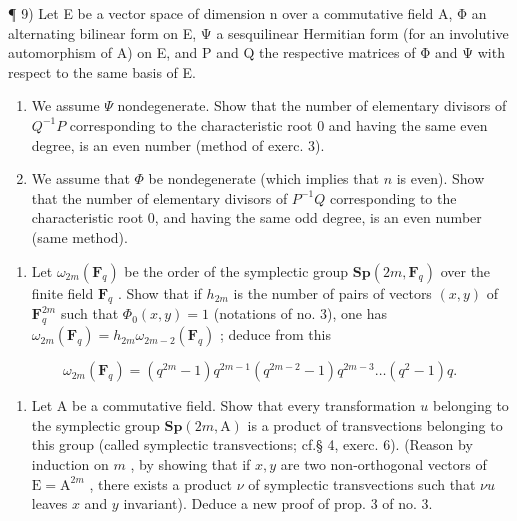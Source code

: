 ¶ 9) Let E be a vector space of dimension n over a commutative field A, Φ an alternating bilinear form on E, Ψ a sesquilinear Hermitian form (for an involutive automorphism of A) on E, and P and Q the respective matrices of Φ and Ψ with respect to the same basis of E.

\begin{enumerate}
\def\labelenumi{\alph{enumi})}
\item
  We assume \(\Psi\) nondegenerate. Show that the number of elementary divisors of \(Q^{-1}P\) corresponding to the characteristic root 0 and having the same even degree, is an even number (method of exerc. 3).
\item
  We assume that \(\Phi\) be nondegenerate (which implies that \(n\) is even). Show that the number of elementary divisors of \(P^{-1}Q\) corresponding to the characteristic root 0, and having the same odd degree, is an even number (same method).
\end{enumerate}

\begin{enumerate}
\def\labelenumi{\arabic{enumi})}
\setcounter{enumi}{9}
\tightlist
\item
  Let \(\omega_{2m}(\mathbf{F}_q)\) be the order of the symplectic group \(\mathbf{Sp}(2m, \mathbf{F}_q)\) over the finite field \(\mathbf{F}_q\) . Show that if \(h_{2m}\) is the number of pairs of vectors \((x, y)\) of \(\mathbf{F}_q^{2m}\) such that \(\Phi_0(x, y) = 1\) (notations of no. 3), one has \(\omega_{2m}(\mathbf{F}_q) = h_{2m}\omega_{2m-2}(\mathbf{F}_q)\) ; deduce from this
\end{enumerate}

\[
\omega_ {2 m} (\mathbf {F} _ {q}) = (q ^ {2 m} - 1) q ^ {2 m - 1} (q ^ {2 m - 2} - 1) q ^ {2 m - 3} \dots (q ^ {2} - 1) q.
\]

\begin{enumerate}
\def\labelenumi{\arabic{enumi})}
\setcounter{enumi}{10}
\tightlist
\item
  Let A be a commutative field. Show that every transformation \(u\) belonging to the symplectic group \(\mathbf{Sp}(2m, \mathrm{A})\) is a product of transvections belonging to this group (called symplectic transvections; cf.§ 4, exerc. 6). (Reason by induction on \(m\) , by showing that if \(x, y\) are two non-orthogonal vectors of \(\mathrm{E} = \mathrm{A}^{2m}\) , there exists a product \(\nu\) of symplectic transvections such that \(\nu u\) leaves \(x\) and \(y\) invariant). Deduce a new proof of prop. 3 of no. 3.
\end{enumerate}

